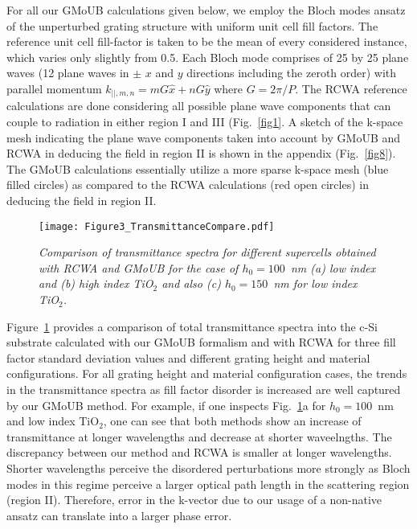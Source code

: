 \documentclass[ floatfix,reprint,amsmath,amssymb,aps,prb]{revtex4-1}
\begin{document}
For all our GMoUB calculations given below, we employ the Bloch modes ansatz of the unperturbed grating structure with uniform unit cell fill factors. The reference unit cell fill-factor is taken to be the mean of every considered instance, which varies only slightly from 0.5.  Each Bloch mode comprises of 25 by 25 plane waves (12 plane waves in $\pm$ $x$ and $y$ directions including the zeroth order) with parallel momentum $k_{||,m,n} = m G \hat{x}+ n G \hat{y}$ where $G=2\pi/P$. The RCWA reference calculations are done considering all possible plane wave components that can couple to radiation in either region I and III (Fig.~\ref{fig1}. A sketch of the k-space mesh indicating the plane wave components taken into account by GMoUB and RCWA in deducing the field in region II is shown in the appendix (Fig.~\ref{fig8}). The GMoUB calculations essentially utilize a more sparse k-space mesh (blue filled circles) as compared to the RCWA calculations (red open circles) in deducing the field in region II.


\begin{figure}[ht]

	\texttt{[image: Figure3\_TransmittanceCompare.pdf]}
	\caption{\textit{Comparison of transmittance spectra for different supercells obtained with RCWA and GMoUB for the case of $h_0=100$~nm (a) low index and (b) high index TiO$_2$ and also (c) $h_0=150$~nm for low index TiO$_2$. }}\label{fig3}

\end{figure}
Figure~\ref{fig3}  provides a comparison of total transmittance spectra into the c-Si substrate calculated with our GMoUB formalism and with RCWA for three fill factor standard deviation values and different grating height and material configurations. For all grating height and material configuration cases, the trends in the transmittance spectra as fill factor disorder is increased are well captured by our GMoUB method. For example, if one inspects Fig.~\ref{fig3}a for $h_0=100$~nm and low index TiO$_2$, one can see that both methods show an increase of transmittance at longer wavelengths and decrease at shorter waveelngths. The discrepancy between our method and RCWA is smaller at longer wavelengths. Shorter wavelengths perceive the disordered perturbations more strongly as Bloch modes in this regime perceive a larger optical path length in the scattering region (region II). Therefore, error in the k-vector due to our usage of a non-native ansatz can translate into a larger phase error. 
\end{document}

